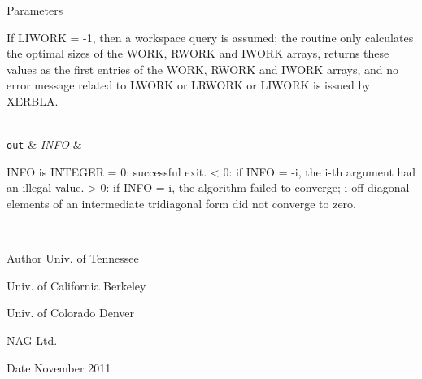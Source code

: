 \begin{DoxyParams}[1]{Parameters}
\begin{DoxyVerb}
          If LIWORK = -1, then a workspace query is assumed; the
          routine only calculates the optimal sizes of the WORK, RWORK
          and IWORK arrays, returns these values as the first entries
          of the WORK, RWORK and IWORK arrays, and no error message
          related to LWORK or LRWORK or LIWORK is issued by XERBLA.\end{DoxyVerb}
\\
\hline
\mbox{\tt out}  & {\em I\+N\+F\+O} & \begin{DoxyVerb}          INFO is INTEGER
          = 0:  successful exit.
          < 0:  if INFO = -i, the i-th argument had an illegal value.
          > 0:  if INFO = i, the algorithm failed to converge; i
                off-diagonal elements of an intermediate tridiagonal
                form did not converge to zero.\end{DoxyVerb}
 \\
\hline
\end{DoxyParams}
\begin{DoxyAuthor}{Author}
Univ. of Tennessee 

Univ. of California Berkeley 

Univ. of Colorado Denver 

N\+A\+G Ltd. 
\end{DoxyAuthor}
\begin{DoxyDate}{Date}
November 2011 
\end{DoxyDate}

